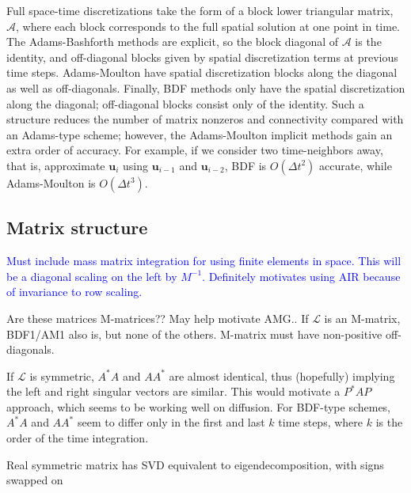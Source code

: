 \documentclass[a4paper,12pt]{article}
\newcommand{\tcb}{\textcolor{blue}}
\begin{document}
Full space-time discretizations take the form of a block lower triangular matrix, $\mathcal{A}$, where each block corresponds to the full
spatial solution at one point in time. The Adams-Bashforth methods are explicit, so the block diagonal of $\mathcal{A}$ is the identity,
and off-diagonal blocks given by spatial discretization terms at previous time steps. Adams-Moulton have spatial discretization blocks
along the diagonal as well as off-diagonals. Finally, BDF methods only have the spatial discretization along the diagonal; off-diagonal
blocks consist only of the identity. Such a structure reduces the number of matrix nonzeros and connectivity compared with an
Adams-type scheme; however, the Adams-Moulton implicit methods gain an extra order of accuracy. For example, if we consider
two time-neighbors away, that is, approximate $\mathbf{u}_i$ using $\mathbf{u}_{i-1}$ and $\mathbf{u}_{i-2}$, BDF is $O(\Delta t^2)$
accurate, while Adams-Moulton is $O(\Delta t^3)$. 

\subsection{Matrix structure}

\tcb{Must include mass matrix integration for using finite elements in space. This will be a diagonal scaling
on the left by $M^{-1}$. Definitely motivates using AIR because of invariance to row scaling. }


Are these matrices M-matrices?? May help motivate AMG.. If $\mathcal{L}$ is an M-matrix, BDF1/AM1 also is, but none of the others.
M-matrix must have non-positive off-diagonals.

If $\mathcal{L}$ is symmetric, $A^*A$ and $AA^*$ are almost identical, thus (hopefully) implying the left and right singular vectors are
similar. This would motivate a $P^*AP$ approach, which seems to be working well on diffusion. For BDF-type schemes, $A^*A$ and $AA^*$
seem to differ only in the first and last $k$ time steps, where $k$ is the order of the time integration.

Real symmetric matrix has SVD equivalent to eigendecomposition, with signs swapped on 




\end{document}

